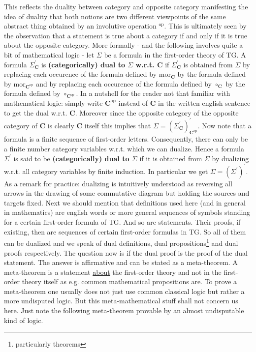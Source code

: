 This reflects the duality between category and opposite category manifesting the idea of duality that both notions are two different viewpoints of the same abstract thing obtained by an involutive operation $^{\mathrm{op}}$. This is ultimately seen by the observation that a statement is true about a category if and only if it is true about the opposite category. More formally - and the following involves quite a bit of mathematical logic - let $\Sigma$ be a formula in the first-order theory of TG. A formula $\Sigma_{\mathbf{C}}^{\prime}$ is \textbf{(categorically) dual to $\Sigma$ w.r.t. $\mathbf{C}$} if $\Sigma_{\mathbf{C}}^{\prime}$ is obtained from $\Sigma$ by replacing each occurence of the formula defined by $\mathrm{mor}_{\mathbf{C}}$ by the formula defined by $\mathrm{mor}_{\mathbf{C}^{\mathrm{op}}}$ and by replacing each occurence of the formula defined by $\circ_{\mathbf{C}}$ by the formula defined by $\circ_{\mathbf{C}^{\mathrm{op}}}$. In a nutshell for the reader not that familiar with mathematical logic: simply write $\mathbf{C}^{\mathrm{op}}$ instead of $\mathbf{C}$ in the written english sentence to get the dual w.r.t. $\mathbf{C}$. Moreover since the opposite category of the opposite category of $\mathbf{C}$ is clearly $\mathbf{C}$ itself this implies that $\Sigma = (\Sigma_{\mathbf{C}}^{\prime})_{\mathbf{C}^{\mathrm{op}}}^{\prime}$. Now note that a formula is a finite sequence of first-order letters. Consequently, there can only be a finite number category variables w.r.t. which we can dualize. Hence a formula $\Sigma^{\prime}$ is said to be \textbf{(categorically) dual to $\Sigma$} if it is obtained from $\Sigma$ by dualizing w.r.t. all category variables by finite induction. In particular we get $\Sigma = (\Sigma^{\prime})^{\prime}$. As a remark for practice: dualizing is intuitively understood as reversing all arrows in the drawing of some commutative diagram but holding the sources and targets fixed. Next we should mention that definitions used here (and in general in mathematics) are english words or more general sequences of symbols standing for a certain first-order formula of TG. And so are statements. Their proofs, if existing, then are sequences of certain first-order formulas in TG. So all of them can be dualized and we speak of dual definitions, dual propositions\footnote{particularly theorems} and dual proofs respectively. The question now is if the dual proof is the proof of the dual statement. The answer is affirmative and can be stated as a meta-theorem. A meta-theorem is a statement \underline{about} the first-order theory and not in the first-order theory itself as e.g. common mathematical propositions are. To prove a meta-theorem one usually does not just use common classical logic but rather a more undisputed logic. But this meta-mathematical stuff shall not concern us here. Just note the following meta-theorem provable by an almost undisputable kind of logic.

